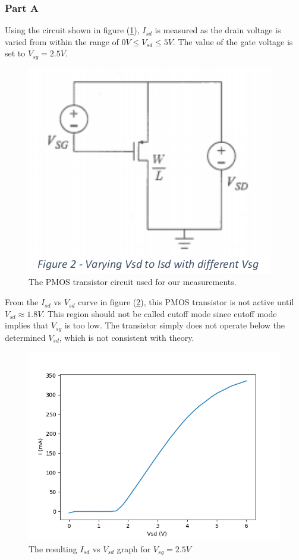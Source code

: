 \subsubsection{Part A}
Using the circuit shown in figure (\ref{fig:pmos_circuit}), $I_{sd}$ is measured as the drain voltage is varied from within the range of $0 V \le V_{sd} \le 5 V$. 
The value of the gate voltage is set to $V_{sg} = 2.5V$. 
\\

\FloatBarrier

\begin{figure}[h!]
	\centering
	\includegraphics[scale=0.75]{./images/pmos_circuit}
	\caption{The PMOS transistor circuit used for our measurements.}
	\label{fig:pmos_circuit}
\end{figure}

\FloatBarrier
From the $I_{sd}$ vs $V_{sd}$ curve in figure (\ref{fig:pmos}), this PMOS transistor is not active until $V_{sd} \approx 1.8 V$. This region should not be called cutoff mode since cutoff mode implies that $V_{sg}$ is too low. The transistor simply does not operate below the determined $V_{sd}$, which is not consistent with theory.

\FloatBarrier

\begin{figure}[h!]
	\centering
	\includegraphics[scale=0.75]{./data/pmos.png}
	\caption{The resulting $I_{sd}$ vs $V_{sd}$ graph for $V_{sg}=2.5V$}
	\label{fig:pmos}
\end{figure}

